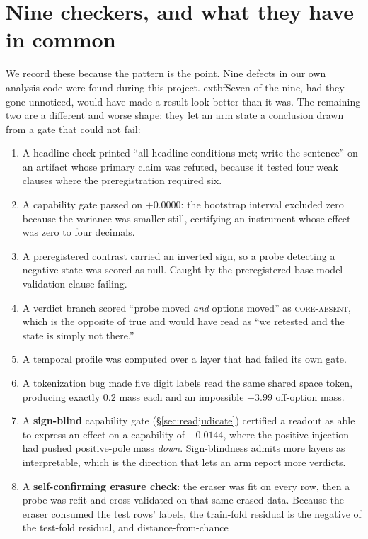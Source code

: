 \documentclass{article}
\begin{document}
\section{Nine checkers, and what they have in common}
\label{sec:checkers}

We record these because the pattern is the point. Nine defects in our own analysis code were found
during this project. 	extbf{Seven of the nine, had they gone unnoticed, would have made a result
look better than it was.} The remaining two are a different and worse shape: they let an arm
state a conclusion drawn from a gate that could not fail:

\begin{enumerate}\itemsep2pt
\item A headline check printed ``all headline conditions met; write the sentence'' on an artifact
whose primary claim was refuted, because it tested four weak clauses where the preregistration
required six.
\item A capability gate passed on $+0.0000$: the bootstrap interval excluded zero because the
variance was smaller still, certifying an instrument whose effect was zero to four decimals.
\item A preregistered contrast carried an inverted sign, so a probe detecting a negative state was
scored as null. Caught by the preregistered base-model validation clause failing.
\item A verdict branch scored ``probe moved \emph{and} options moved'' as \textsc{core-absent},
which is the opposite of true and would have read as ``we retested and the state is simply not
there.''
\item A temporal profile was computed over a layer that had failed its own gate.
\item A tokenization bug made five digit labels read the same shared space token, producing exactly
$0.2$ mass each and an impossible $-3.99$ off-option mass.
\item A \textbf{sign-blind} capability gate (\S\ref{sec:readjudicate}) certified a readout as able to
express an effect on a capability of $-0.0144$, where the positive injection had pushed positive-pole
mass \emph{down}. Sign-blindness admits more layers as interpretable, which is the direction that
lets an arm report more verdicts.
\item A \textbf{self-confirming erasure check}: the eraser was fit on every row, then a probe was
refit and cross-validated on that same erased data. Because the eraser consumed the test rows'
labels, the train-fold residual is the negative of the test-fold residual, and distance-from-chance

\end{enumerate}
\end{document}
